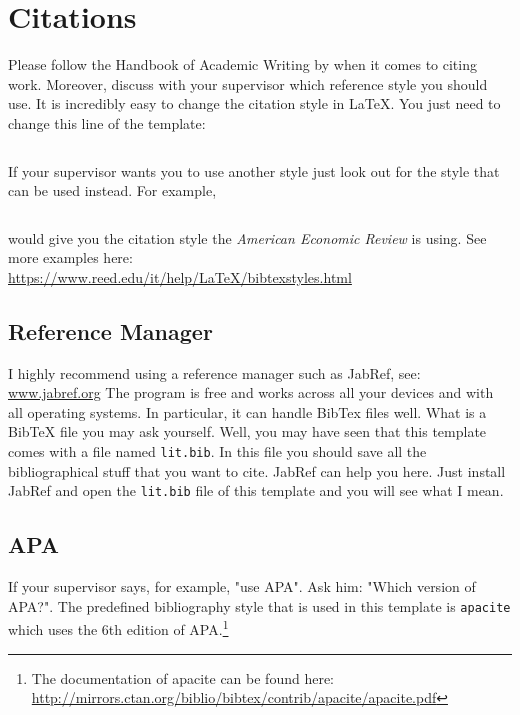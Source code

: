 \documentclass[12pt,final,a4paper,oneside]{book}
\begin{document}
\section{Citations}
	
Please follow the Handbook of Academic Writing by  \cite{Hildebrandt2019} when it comes to citing work.
Moreover, discuss with your supervisor which reference style you should use. It is incredibly easy to change the citation style in \LaTeX. You just need to change this line of the template: 
\begin{verbatim}

\end{verbatim}
If your supervisor wants you to use another style just look out for the style that can be used instead. For example, 
\begin{verbatim}

\end{verbatim}
would give you the citation style the \textit{American Economic Review} is using. See more examples here:\\ \url{https://www.reed.edu/it/help/LaTeX/bibtexstyles.html}




	
\subsection{Reference Manager}
	
I highly recommend using a reference manager such as JabRef, see: \url{www.jabref.org} The program is free and works across all your devices and with all operating systems. In particular, it can handle BibTex files well. What is a BibTeX file you may ask yourself. Well, you may have seen that this template comes with a file named \texttt{lit.bib}. In this file you should save all the bibliographical stuff that you want to cite. JabRef can help you here. Just install JabRef and open the \texttt{lit.bib} file of this template and you will see what I mean.
	
\subsection{APA}
	
If your supervisor says, for example, "use APA". Ask him: "Which version of APA?". The predefined bibliography style that is used in this template is \verb*|apacite| which uses the 6th edition of APA.\footnote{The documentation of apacite can be found here: \url{http://mirrors.ctan.org/biblio/bibtex/contrib/apacite/apacite.pdf}}
\end{document}
